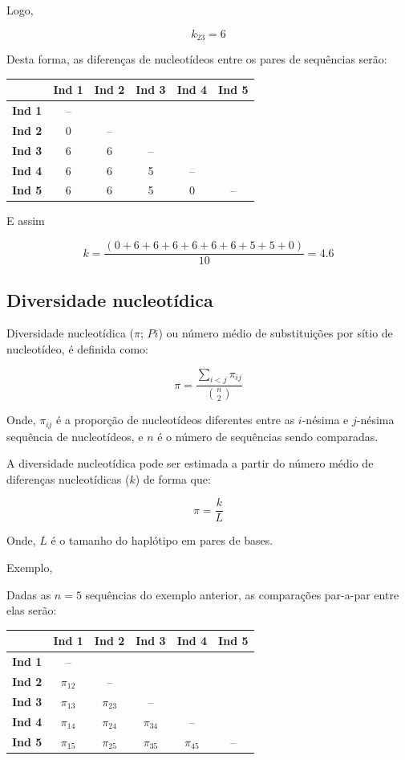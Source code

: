 \documentclass[
]{book}
\begin{document}
Logo,

\[k_{23} = 6\]

Desta forma, as diferenças de nucleotídeos entre os pares de sequências serão:

\begin{longtable}[]{@{}lccccc@{}}
\toprule()
& Ind 1 & Ind 2 & Ind 3 & Ind 4 & Ind 5 \\
\midrule()
\endhead
\textbf{Ind 1} & -- & & & & \\
\textbf{Ind 2} & 0 & -- & & & \\
\textbf{Ind 3} & 6 & 6 & -- & & \\
\textbf{Ind 4} & 6 & 6 & 5 & -- & \\
\textbf{Ind 5} & 6 & 6 & 5 & 0 & -- \\
\bottomrule()
\end{longtable}

E assim

\[k = \frac{\left( 0+6+6+6+6+6+6+5+5+0 \right)}{10}=4.6\]

\hypertarget{diversidade-nucleotuxeddica}{%
\subsection{Diversidade nucleotídica}\label{diversidade-nucleotuxeddica}}

Diversidade nucleotídica (\(\pi\); \(Pi\)) ou número médio de substituições por sítio de nucleotídeo, é definida como:

\begin{equation} 
\pi = \frac { \sum_{i<j}^{} \pi_{ij} } { \binom{n}{2} }
  \label{eq:nucleotidediversity}
\end{equation}

Onde,
\(\pi_{ij}\) é a proporção de nucleotídeos diferentes entre as \(i\)-nésima e \(j\)-nésima sequência de nucleotídeos, e
\(n\) é o número de sequências sendo comparadas.

A diversidade nucleotídica pode ser estimada a partir do número médio de diferenças nucleotídicas (\(k\)) de forma que:

\[ \pi = \frac {k} {L} \]

Onde,
\(L\) é o tamanho do haplótipo em pares de bases.

Exemplo,

Dadas as \(n=5\) sequências do exemplo anterior, as comparações par-a-par entre elas serão:

\begin{longtable}[]{@{}lccccc@{}}
\toprule()
& Ind 1 & Ind 2 & Ind 3 & Ind 4 & Ind 5 \\
\midrule()
\endhead
\textbf{Ind 1} & -- & & & & \\
\textbf{Ind 2} & \(\pi_{12}\) & -- & & & \\
\textbf{Ind 3} & \(\pi_{13}\) & \(\pi_{23}\) & -- & & \\
\textbf{Ind 4} & \(\pi_{14}\) & \(\pi_{24}\) & \(\pi_{34}\) & -- & \\
\textbf{Ind 5} & \(\pi_{15}\) & \(\pi_{25}\) & \(\pi_{35}\) & \(\pi_{45}\) & -- \\
\bottomrule()
\end{longtable}
\end{document}
